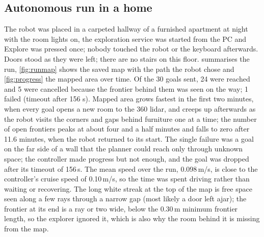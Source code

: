 \subsection{Autonomous run in a home}
The robot was placed in a carpeted hallway of a furnished apartment at night with the room lights on, the exploration service was started from the PC and Explore was pressed once; nobody touched the robot or the keyboard afterwards. Doors stood as they were left; there are no stairs on this floor.  summarises the run, \cref{fig:runmap} shows the saved map with the path the robot chose and \cref{fig:progress} the mapped area over time. Of the 30 goals sent, 24 were reached and 5 were cancelled because the frontier behind them was seen on the way; 1 failed (timeout after 156 s). Mapped area grows fastest in the first two minutes, when every goal opens a new room to the 360\textdegree{} lidar, and creeps up afterwards as the robot visits the corners and gaps behind furniture one at a time; the number of open frontiers peaks at about four and a half minutes and falls to zero after 11.6 minutes, when the robot returned to its start. The single failure was a goal on the far side of a wall that the planner could reach only through unknown space; the controller made progress but not enough, and the goal was dropped after its timeout of 156\,s. The mean speed over the run, 0.098\,m/s, is close to the controller's cruise speed of 0.10\,m/s, so the time was spent driving rather than waiting or recovering. The long white streak at the top of the map is free space seen along a few rays through a narrow gap (most likely a door left ajar); the frontier at its end is a ray or two wide, below the 0.30\,m minimum frontier length, so the explorer ignored it, which is also why the room behind it is missing from the map.

